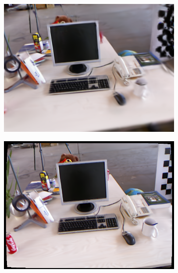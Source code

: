 \begin{figure}[ht]
	\centering
    \begin{subfigure}[ht]{0.24\linewidth}
        \includegraphics[width=1\linewidth]{fig/fig_mono/tum/fr2_/MonoGS/00001.png}
    \end{subfigure}
    \begin{subfigure}[ht]{0.24\linewidth}
        \includegraphics[width=1\linewidth]{fig/fig_mono/tum/fr2_/Photo-SLAM/1311867170.894378.png}
    \end{subfigure}
    \begin{subfigure}[ht]{0.24\linewidth}

\end{subfigure}
\end{figure}

